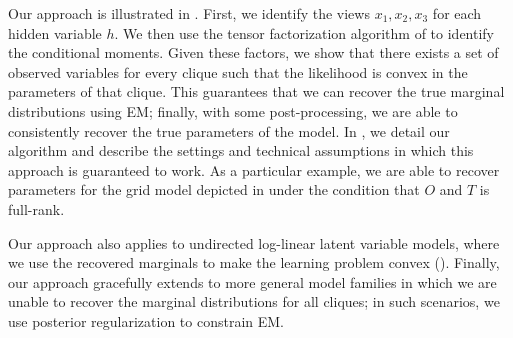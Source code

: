 Our approach is illustrated in . 
First, we identify the views $x_1, x_2, x_3$ for each hidden variable $h$. 
We then use the tensor factorization algorithm of
  \citet{anandkumar12moments,anandkumar13tensor} to identify the
  conditional moments.
Given these factors, we show that there exists a set of observed
  variables for every clique such that the likelihood is convex in the
  parameters of that clique. 
This guarantees that we can recover the true marginal distributions
  using EM; finally, with some post-processing, we are able to
  consistently recover the true parameters of the model.
In , we detail our algorithm and describe the
  settings and technical assumptions in which this approach is guaranteed
  to work.
As a particular example, we are able to recover parameters for the
  grid model depicted in  under the condition that
  $O$ and $T$ is full-rank.

Our approach also applies to undirected log-linear latent variable
  models, where we use the recovered marginals to make the learning
  problem convex ().
Finally, our approach gracefully extends to more general model families
  in which we are unable to recover the marginal distributions for all
  cliques; in such scenarios, we use posterior regularization to constrain
  EM. 
